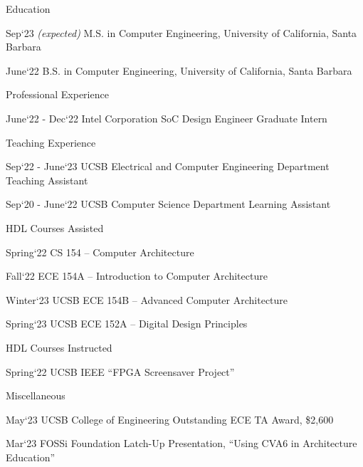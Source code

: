 \begin{vitae}

    \begin{vitaesection}{Education}
    \vspace{-0.1cm}
    \item [Sep`23 \emph{(expected)}] M.S. in Computer Engineering, University of California, Santa Barbara
    \item [June`22] B.S. in Computer Engineering, University of California, Santa Barbara
    \end{vitaesection}

    \begin{vitaesection}{Professional Experience}
        \vspace{-0.1cm}
        \item [June`22 - Dec`22] Intel Corporation SoC Design Engineer Graduate Intern
    \end{vitaesection}

    \begin{vitaesection}{Teaching Experience}
        \vspace{-0.1cm}
        \item [Sep`22 - June`23] UCSB Electrical and Computer Engineering Department Teaching Assistant
        \item [Sep`20 - June`22] UCSB Computer Science Department Learning Assistant
    \end{vitaesection}

    \begin{vitaesection}{HDL Courses Assisted}
        \vspace{-0.1cm}
        \item [Spring`22] CS 154 -- Computer Architecture
        \item [Fall`22] ECE 154A -- Introduction to Computer Architecture
        \item [Winter`23] UCSB ECE 154B -- Advanced Computer Architecture
        \item [Spring`23] UCSB ECE 152A -- Digital Design Principles
    \end{vitaesection}

    \begin{vitaesection}{HDL Courses Instructed}
        \vspace{-0.1cm}
        \item [Spring`22] UCSB IEEE ``FPGA Screensaver Project''
    \end{vitaesection}

    \begin{vitaesection}{Miscellaneous}
        \vspace{-0.1cm}
        \item [May`23] UCSB College of Engineering Outstanding ECE TA Award, \$2,600
        \item [Mar`23] FOSSi Foundation Latch-Up Presentation, ``Using CVA6 in Architecture Education''
    \end{vitaesection}

\end{vitae}
